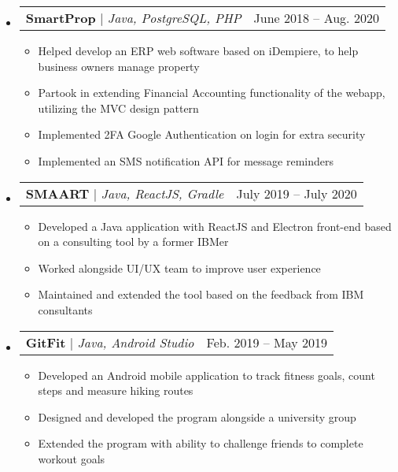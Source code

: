 \documentclass[letterpaper,11pt]{article}
\makeatletter
\newcommand{\resumeItem}[1]{
  \item\small{
    {#1 \vspace{-2pt}}
  }
}
\newcommand{\resumeProjectHeading}[2]{
    \item
    \begin{tabular*}{0.97\textwidth}{l@{\extracolsep{\fill}}r}
      \small#1 & #2 \\
    \end{tabular*}\vspace{-7pt}
}
\newcommand{\resumeSubHeadingListStart}{\begin{itemize}[leftmargin=0.15in, label={}]}
\newcommand{\resumeSubHeadingListEnd}{\end{itemize}}
\newcommand{\resumeItemListStart}{\begin{itemize}}
\newcommand{\resumeItemListEnd}{\end{itemize}\vspace{-5pt}}
\makeatother
\begin{document}
    \resumeSubHeadingListStart
      \resumeProjectHeading
          {\textbf{SmartProp} $|$ \emph{Java, PostgreSQL, PHP}}{June 2018 -- Aug. 2020}
          \resumeItemListStart
            \resumeItem{Helped develop an ERP web software based on iDempiere, to help business owners manage property}
            \resumeItem{Partook in extending Financial Accounting functionality of the webapp, utilizing the MVC design pattern}
            \resumeItem{Implemented 2FA Google Authentication on login for extra security}
            \resumeItem{Implemented an SMS notification API for message reminders}

          \resumeItemListEnd
    \resumeSubHeadingListEnd
    
   \resumeSubHeadingListStart
      \resumeProjectHeading
        {\textbf{SMAART} $|$ \emph{Java, ReactJS, Gradle}}{July 2019 -- July 2020}
       \resumeItemListStart
       \resumeItem{Developed a Java application with ReactJS and Electron front-end based on a consulting tool by a former IBMer}
       \resumeItem{Worked alongside UI/UX team to improve user experience }
       \resumeItem{Maintained and extended the tool based on the feedback from IBM consultants}
       \resumeItemListEnd
   \resumeSubHeadingListEnd
   
      \resumeSubHeadingListStart
      \resumeProjectHeading
          {\textbf{GitFit} $|$ \emph{Java, Android Studio}}{Feb. 2019 -- May 2019}
       \resumeItemListStart
       \resumeItem{Developed an Android mobile application to track fitness goals, count steps and measure hiking routes}
       \resumeItem{Designed and developed the program alongside a university group}
       \resumeItem{Extended the program with ability to challenge friends to complete workout goals}
       \resumeItemListEnd
   \resumeSubHeadingListEnd
   
\end{document}
